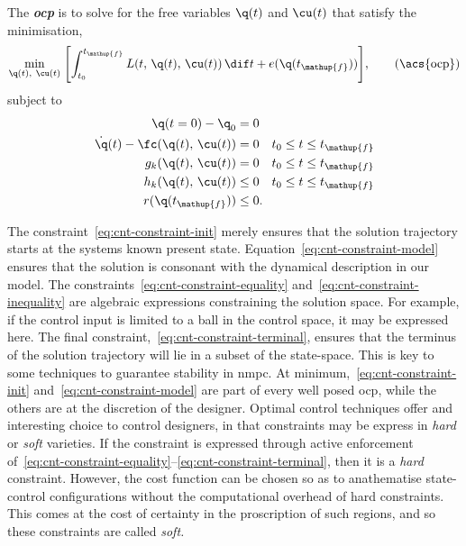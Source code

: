 \begin{definition}\label{def:ocp}
%
The \emph{\textbf{\acf{ocp}}} is to solve for the free variables $\q(t)$ and
$\cu(t)$ that satisfy the minimisation,
%
\begin{equation}
\min_{\q(t),\ \cu(t)}\; \Biggl[ \int_{t_0}^{t_\mathup{f}} L(t,\, \q(t),\, \cu(t))\,\dif t + e(\q(t_\mathup{f})) \Biggr],\tag{\acs{ocp}}\label{eq:ocp}
\end{equation}
%
subject to
%
\begin{align}
  \q(t=0) - \q_0 &= 0\label{eq:cnt-constraint-init}\\
  \dot{\q}(t) - \fc(\q(t),\, \cu(t)) &= 0\quad t_0 \le t \le t_\mathup{f}\label{eq:cnt-constraint-model}\\
  g_k(\q(t),\, \cu(t)) &= 0\quad t_0 \le t \le t_\mathup{f}\label{eq:cnt-constraint-equality}\\
  h_k(\q(t),\, \cu(t)) &\leq 0\quad t_0 \le t \le t_\mathup{f}\label{eq:cnt-constraint-inequality}\\
  r(\q(t_\mathup{f})) &\le 0.\label{eq:cnt-constraint-terminal}
\end{align}
%
\end{definition}
The constraint~\eqref{eq:cnt-constraint-init} merely ensures that the solution
trajectory starts at the systems known present state.
Equation~\eqref{eq:cnt-constraint-model} ensures that the solution is consonant
with the dynamical description in our model. The
constraints~\eqref{eq:cnt-constraint-equality}
and~\eqref{eq:cnt-constraint-inequality} are algebraic expressions constraining
the solution space. For example, if the control input is limited to a ball in
the control space, it may be expressed here. The final
constraint,~\eqref{eq:cnt-constraint-terminal}, ensures that the terminus of the
solution trajectory will lie in a subset of the state-space. This is key to some
techniques to guarantee stability in \ac{nmpc}. At
minimum,~\eqref{eq:cnt-constraint-init} and~\eqref{eq:cnt-constraint-model} are
part of every well posed \ac{ocp}, while the others are at the discretion of the
designer. Optimal control techniques offer and interesting choice to control
designers, in that constraints may be express in
\emph{hard} or
\emph{soft} varieties. If the
constraint is expressed through active enforcement
of~\eqref{eq:cnt-constraint-equality}–\eqref{eq:cnt-constraint-terminal}, then
it is a \emph{hard} constraint. However, the cost function can be chosen so as
to anathematise state-control configurations without the computational overhead
of hard constraints. This comes at the cost of certainty in the proscription of
such regions, and so these constraints are called \emph{soft.}



